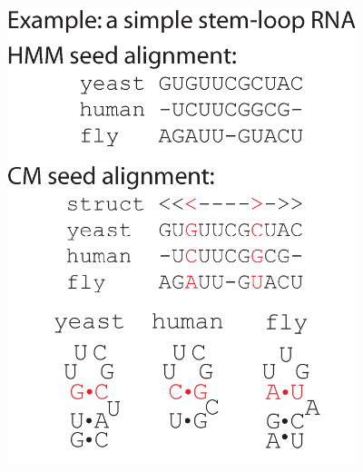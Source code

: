 \documentclass[landscape]{slides}
\begin{document}
\begin{slide}
\begin{minipage}{6in}
%
\normalsize
\vspace{1.6in}
\end{minipage}
\hspace{0.5in}
\begin{minipage}{4in}
\begin{center}
\includegraphics[width=4in]{figs/pm_intro_seeds}
\vspace{1.5in}
\end{center}
\end{minipage}
\vfill

\end{slide}
\end{document}
